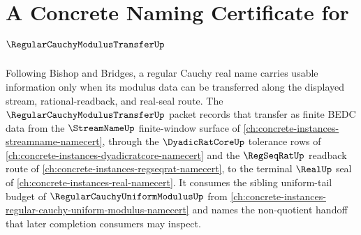 \chapter{A Concrete Naming Certificate for $\RegularCauchyModulusTransferUp$}
\label{ch:concrete-instances-regular-cauchy-modulus-transfer-namecert}

Following Bishop and Bridges, a regular Cauchy real name carries usable information only when its modulus data can be transferred along the displayed stream, rational-readback, and real-seal route. The $\RegularCauchyModulusTransferUp$ packet records that transfer as finite BEDC data from the $\StreamNameUp$ finite-window surface of \autoref{ch:concrete-instances-streamname-namecert}, through the $\DyadicRatCoreUp$ tolerance rows of \autoref{ch:concrete-instances-dyadicratcore-namecert} and the $\RegSeqRatUp$ readback route of \autoref{ch:concrete-instances-regseqrat-namecert}, to the terminal $\RealUp$ seal of \autoref{ch:concrete-instances-real-namecert}. It consumes the sibling uniform-tail budget of $\RegularCauchyUniformModulusUp$ from \autoref{ch:concrete-instances-regular-cauchy-uniform-modulus-namecert} and names the non-quotient handoff that later completion consumers may inspect.

